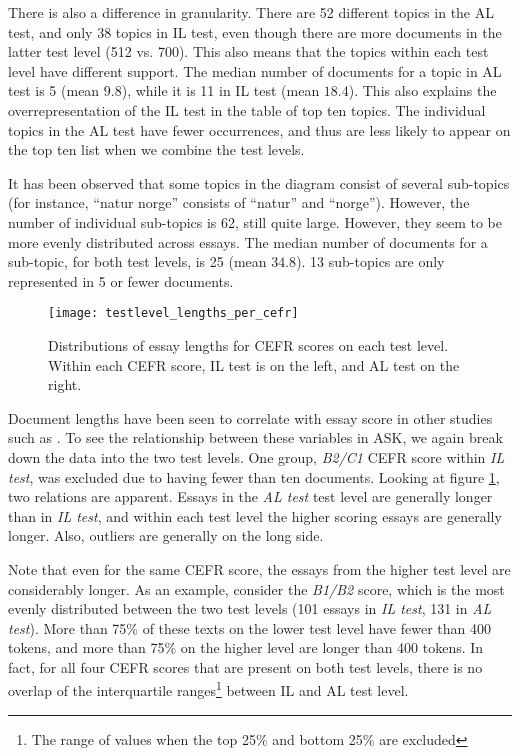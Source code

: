 There is also a difference in granularity. There are 52 different topics in
the AL test, and only 38 topics in IL test, even though there are more
documents in the latter test level (512 vs. 700). This also means that the
topics within each test level have different support. The median number of
documents for a topic in AL test is 5 (mean $9.8$), while it is 11 in IL test
(mean $18.4$). This also explains the overrepresentation of the IL test in
the table of top ten topics. The individual topics in the AL test have fewer
occurrences, and thus are less likely to appear on the top ten list when we
combine the test levels.

It has been observed that some topics in the diagram consist of several
sub-topics (for instance, ``natur norge'' consists of ``natur'' and
``norge''). However, the number of individual sub-topics is 62, still quite
large. However, they seem to be more evenly distributed across essays. The
median number of documents for a sub-topic, for both test levels, is 25 (mean
$34.8$). 13 sub-topics are only represented in 5 or fewer documents.

\begin{figure}
  \centering
  \texttt{[image: testlevel\_lengths\_per\_cefr]}
  \caption[Document lengths on each CEFR level]{
    Distributions of essay lengths for CEFR scores on each test level.
    Within each CEFR score, IL test is on the left, and AL test on the right.
  }
  \label{fig:testlevel-lengths-per-cefr}
\end{figure}

Document lengths have been seen to correlate with essay score in other
studies such as \textcite{vajjala17}. To see the relationship between these
variables in ASK, we again break down the data into the two test levels. One
group, \emph{B2/C1} CEFR score within \emph{IL test}, was excluded due to
having fewer than ten documents. Looking at figure
\ref{fig:testlevel-lengths-per-cefr}, two relations are apparent. Essays in
the \emph{AL test} test level are generally longer than in \emph{IL test},
and within each test level the higher scoring essays are generally longer.
Also, outliers are generally on the long side.

Note that even for the same CEFR score, the essays from the higher test level
are considerably longer. As an example, consider the \emph{B1/B2} score,
which is the most evenly distributed between the two test levels (101 essays
in \emph{IL test}, 131 in \emph{AL test}). More than 75\% of these texts on
the lower test level have fewer than 400 tokens, and more than 75\% on the
higher level are longer than 400 tokens. In fact, for all four CEFR scores
that are present on both test levels, there is no overlap of the
interquartile ranges\footnote{The range of values when the top 25\% and
bottom 25\% are excluded} between IL and AL test level.


